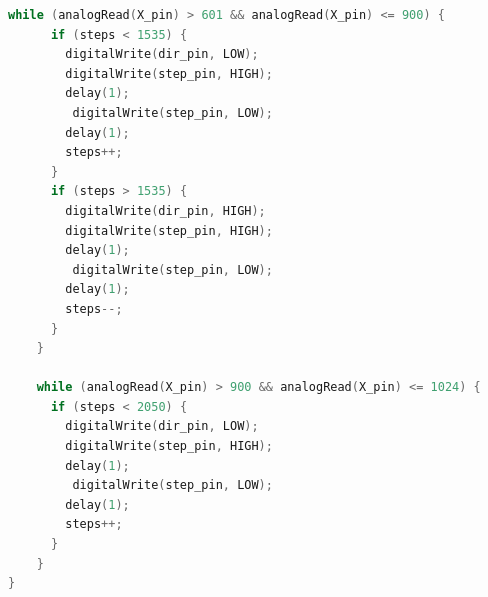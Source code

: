 \documentclass[MTech]{iitmdiss}
\begin{document}
\begin{lstlisting}[language=C]
    while (analogRead(X_pin) > 601 && analogRead(X_pin) <= 900) {
      if (steps < 1535) {
        digitalWrite(dir_pin, LOW);
        digitalWrite(step_pin, HIGH);
        delay(1);
         digitalWrite(step_pin, LOW);
        delay(1);
        steps++;
      }    
      if (steps > 1535) {
        digitalWrite(dir_pin, HIGH);
        digitalWrite(step_pin, HIGH);
        delay(1);
         digitalWrite(step_pin, LOW);
        delay(1);
        steps--;
      }    
    }   
   
    while (analogRead(X_pin) > 900 && analogRead(X_pin) <= 1024) {
      if (steps < 2050) {
        digitalWrite(dir_pin, LOW);
        digitalWrite(step_pin, HIGH);
        delay(1);
         digitalWrite(step_pin, LOW);
        delay(1);
        steps++;
      }
    }
}
\end{lstlisting}
\end{document}
